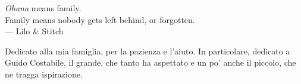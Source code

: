 \thispagestyle{empty}
{}

\vspace*{3cm}

\begin{center}
    \emph{Ohana} means family. \\
    Family means nobody gets left behind, or forgotten. \\ \medskip
    --- Lilo \& Stitch    
\end{center}

\medskip

\begin{center}
    Dedicato alla mia famiglia, per la pazienza e l'aiuto.
    In particolare, dedicato a Guido Costabile, il grande, che tanto ha aspettato
    e un po' anche il piccolo, che ne tragga ispirazione. \\ \smallskip
\end{center}